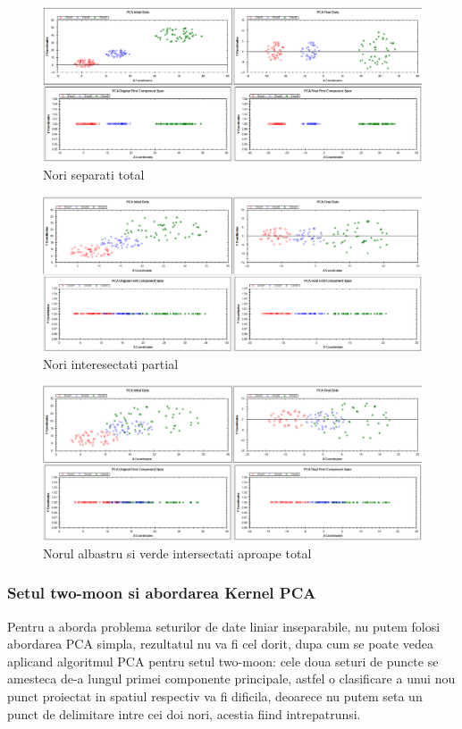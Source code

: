 \documentclass[12pt]{article}
\begin{document}
\begin{figure}[H]
\centering
\caption{Nori separati total}
\includegraphics[width=\linewidth]{threecloud1}
\end{figure}


\begin{figure}[H]
\caption{Nori interesectati partial}
\centering
\includegraphics[width=\linewidth]{threecloud2}
\end{figure}


\begin{figure}[H]
\centering
\caption{Norul albastru si verde intersectati aproape total}
\includegraphics[width=\linewidth]{threecloud3}
\end{figure}


\subsubsection{Setul two-moon si abordarea Kernel PCA}
Pentru a aborda problema seturilor de date liniar inseparabile, nu putem folosi abordarea PCA simpla, rezultatul nu va fi cel dorit, dupa cum se poate vedea aplicand algoritmul PCA pentru setul two-moon: cele doua seturi de puncte se amesteca de-a lungul primei componente principale, astfel o clasificare a unui nou punct proiectat in spatiul respectiv va fi dificila, deoarece nu putem seta un punct de delimitare intre cei doi nori, acestia fiind intrepatrunsi.
\end{document}
